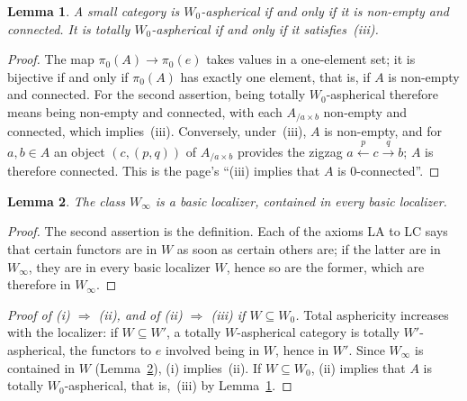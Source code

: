 \documentclass[11pt]{article}
\newcommand{\q}[1]{“#1”}
\theoremstyle{plain}
\newtheorem{lemme}{Lemma}[section]
\theoremstyle{definition}
\theoremstyle{remark}
\begin{document}
\begin{lemme}\label{lem:114-asph}
A small category is $W_0$-aspherical if and only if it is non-empty and connected. It is totally $W_0$-aspherical if and only if it satisfies~(iii).
\end{lemme}

\begin{proof}
The map $\pi_0(A) \to \pi_0(e)$ takes values in a one-element set; it is bijective if and only if $\pi_0(A)$ has exactly one element, that is, if $A$ is non-empty and connected. For the second assertion, being totally $W_0$-aspherical therefore means being non-empty and connected, with each $A_{/a \times b}$ non-empty and connected, which implies~(iii). Conversely, under~(iii), $A$ is non-empty, and for $a, b \in A$ an object $(c, (p, q))$ of $A_{/a \times b}$ provides the zigzag $a \xleftarrow{p} c \xrightarrow{q} b$; $A$ is therefore connected. This is the page's \q{(iii) implies that $A$ is $0$-connected}.
\end{proof}

\begin{lemme}\label{lem:114-min}
The class $W_\infty$ is a basic localizer, contained in every basic localizer.
\end{lemme}

\begin{proof}
The second assertion is the definition. Each of the axioms LA to LC says that certain functors are in $W$ as soon as certain others are; if the latter are in $W_\infty$, they are in every basic localizer $W$, hence so are the former, which are therefore in $W_\infty$.
\end{proof}

\begin{proof}[Proof of (i) $\Rightarrow$ (ii), and of (ii) $\Rightarrow$ (iii) if $W \subseteq W_0$]
Total asphericity increases with the localizer: if $W \subseteq W'$, a totally $W$-aspherical category is totally $W'$-aspherical, the functors to $e$ involved being in $W$, hence in $W'$. Since $W_\infty$ is contained in $W$ (Lemma~\ref{lem:114-min}), (i) implies~(ii). If $W \subseteq W_0$, (ii) implies that $A$ is totally $W_0$-aspherical, that is,~(iii) by Lemma~\ref{lem:114-asph}.
\end{proof}
\end{document}
